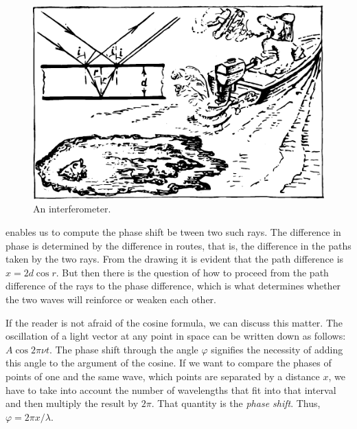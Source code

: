 \begin{figure}[!ht]
\centering
\includegraphics[width=\textwidth]{figures/fig-02-05.pdf}
\caption{An interferometer.}
\label{fig-2.5}
\end{figure}

 enables us to compute the phase shift be­ tween two such rays. The difference in phase is determined by the difference in routes, that is, the difference in the paths taken by the two rays. From the drawing it is evi­dent that the path difference is $x=2 d \cos r$. But then there is the question of how to proceed from the path difference of the rays to the phase difference, which is what determines whether the two waves will reinforce or weaken each other.

If the reader is not afraid of the cosine formula, we can discuss this matter. The oscillation of a light vector at any point in space can be written down as follows: $A \cos 2 \pi \nu t$. The phase shift through the angle $\varphi$ signifies the necessity of adding this angle to the argument of the cosine. If we want to compare the phases of points of one and the same wave, which points are separated by a distance $x$, we have to take into account the number of wavelengths that fit into that interval and then multiply the result by $2 \pi$. That quantity is the \emph{phase shift}. Thus,
$\varphi =2 \pi x/\lambda$.

